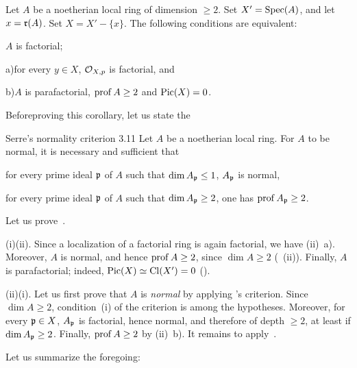 \begin{corollaire} \label{XI.3.10}
Let $A$ be a noetherian local ring of dimension $\geq 2$. Set $X'=\operatorname{Spec}(A)$, and let $x = \mathfrak{r}(A)$. Set $X=X'-\{x\}$. The following conditions are equivalent:
\begin{enumeratei}
\item
$A$ is factorial;
\item
\textup{a)}\enspace for every $y\in X$, $\mathcal O_{X, p}$ is factorial, and
\par\hspace*{6.3mm}\textup{b)}\enspace $A$ is parafactorial, \ie $\operatorname{prof} A\geq 2$ and $\operatorname{Pic}(X)=0$.
\end{enumeratei}
\end{corollaire}

Before\pageoriginale proving this corollary, let us state the
\label{XI.3.11}
\begin{enonce*}{Serre's normality criterion 3.11\sfootnotemark} Let $A$ be a noetherian local ring. For $A$ to be normal, it is necessary and sufficient that
\begin{enumeratei}
\item
for every prime ideal ${\mathfrak{p}}$ of $A$ such that $\dim A_{{\mathfrak{p}}}\leq 1$, $A_{{\mathfrak{p}}}$ is normal,
\item
for every prime ideal ${\mathfrak{p}}$ of $A$ such that $\dim A_{{\mathfrak{p}}}\geq 2$, one has $\operatorname{prof} A_{{\mathfrak{p}}}\geq 2$.
\end{enumeratei}
\end{enonce*}

Let us prove~.

(i)\ALORS (ii). Since a localization of a factorial ring is again factorial, we have (ii)~a). Moreover, $A$ is normal, and hence $\operatorname{prof} A\geq 2$, since $\dim A\geq 2$ (~(ii)). Finally, $A$ is parafactorial; indeed, $\operatorname{Pic}(X)\simeq\operatorname{Cl}(X')=0$ (\cf {}).

(ii)\ALORS (i). Let us first prove that $A$ is \emph{normal} by applying 's criterion. Since $\dim A\geq 2$, condition~(i) of the criterion is among the hypotheses. Moreover, for every ${\mathfrak{p}}\in X$, $A_{{\mathfrak{p}}}$ is factorial, hence normal, and therefore of depth $\geq 2$, at least if $\dim A_{{\mathfrak{p}}}\geq 2$. Finally, $\operatorname{prof} A\geq 2$ by (ii)~b). It remains to apply~.

\smallskip
Let us summarize the foregoing:

